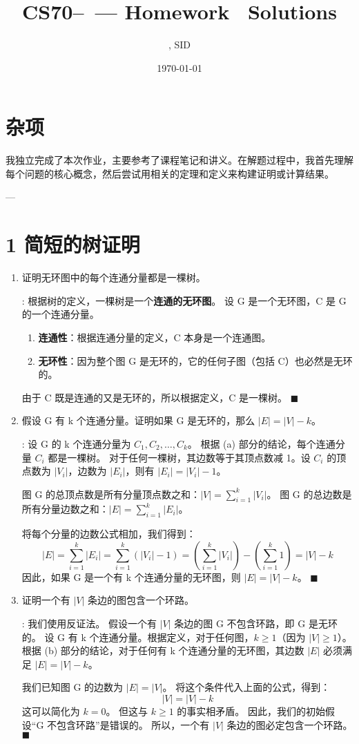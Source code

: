 \documentclass[11pt]{article}
\title{CS70--\Session\ --- Homework \Homework \ Solutions}
\author{\Name, SID \SID}
\date{\today}
\newenvironment{qparts}{\begin{enumerate}[{(}a{)}]}{\end{enumerate}}
\def\endproofmark{$\blacksquare$}
\newenvironment{proof}{\par\noindent{\bf 证明}:}{\endproofmark\smallskip}
\begin{document}
\maketitle

\section*{杂项}
我独立完成了本次作业，主要参考了课程笔记和讲义。在解题过程中，我首先理解每个问题的核心概念，然后尝试用相关的定理和定义来构建证明或计算结果。

---

\section*{1 简短的树证明}

\begin{qparts}
\item 证明无环图中的每个连通分量都是一棵树。
\begin{proof}
根据树的定义，一棵树是一个\textbf{连通的无环图}。
设 G 是一个无环图，C 是 G 的一个连通分量。
\begin{enumerate}
    \item \textbf{连通性}：根据连通分量的定义，C 本身是一个连通图。
    \item \textbf{无环性}：因为整个图 G 是无环的，它的任何子图（包括 C）也必然是无环的。
\end{enumerate}
由于 C 既是连通的又是无环的，所以根据定义，C 是一棵树。
\end{proof}

\item 假设 G 有 k 个连通分量。证明如果 G 是无环的，那么 $|E|=|V|-k$。
\begin{proof}
设 G 的 k 个连通分量为 $C_1, C_2, \dots, C_k$。
根据 (a) 部分的结论，每个连通分量 $C_i$ 都是一棵树。
对于任何一棵树，其边数等于其顶点数减 1。设 $C_i$ 的顶点数为 $|V_i|$，边数为 $|E_i|$，则有 $|E_i| = |V_i| - 1$。

图 G 的总顶点数是所有分量顶点数之和：$|V| = \sum_{i=1}^{k} |V_i|$。
图 G 的总边数是所有分量边数之和：$|E| = \sum_{i=1}^{k} |E_i|$。

将每个分量的边数公式相加，我们得到：
\[ |E| = \sum_{i=1}^{k} |E_i| = \sum_{i=1}^{k} (|V_i| - 1) = \left(\sum_{i=1}^{k} |V_i|\right) - \left(\sum_{i=1}^{k} 1\right) = |V| - k \]
因此，如果 G 是一个有 k 个连通分量的无环图，则 $|E| = |V| - k$。
\end{proof}

\item 证明一个有 $|V|$ 条边的图包含一个环路。
\begin{proof}
我们使用反证法。
假设一个有 $|V|$ 条边的图 G 不包含环路，即 G 是无环的。
设 G 有 k 个连通分量。根据定义，对于任何图，$k \ge 1$（因为 $|V| \ge 1$）。
根据 (b) 部分的结论，对于任何有 k 个连通分量的无环图，其边数 $|E|$ 必须满足 $|E| = |V| - k$。

我们已知图 G 的边数为 $|E| = |V|$。
将这个条件代入上面的公式，得到：
\[ |V| = |V| - k \]
这可以简化为 $k = 0$。
但这与 $k \ge 1$ 的事实相矛盾。
因此，我们的初始假设“G 不包含环路”是错误的。
所以，一个有 $|V|$ 条边的图必定包含一个环路。
\end{proof}
\end{qparts}
\end{document}
